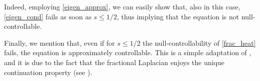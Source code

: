 Indeed, employing \eqref{eigen_approx}, we can easily show that, also in this case, \eqref{eigen_cond} fails as soon as $s\leq 1/2$, thus implying that the equation is not null-controllable. 

Finally, we mention that, even if for $s\leq 1/2$ the null-controllability of \eqref{frac_heat} fails, the equation is approximately controllable. This is a simple adaptation of \cite[Proposition 2.4 and Theorem 2.5]{keyantuo2016interior}, and it is due to the fact that the fractional Laplacian enjoys the unique continuation property (see \cite{fall2014unique}). 